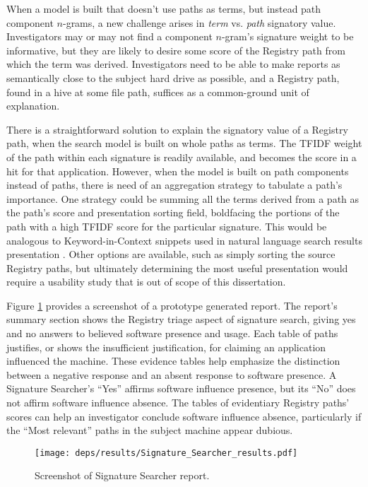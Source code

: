 \documentclass[11pt]{ucthesis}
\theoremstyle{plain}
\theoremstyle{definition}
\begin{document}
When a model is built that doesn't use paths as terms, but instead path component $n$-grams, a new challenge arises in \emph{term} vs. \emph{path} signatory value.  Investigators may or may not find a component $n$-gram's signature weight to be informative, but they are likely to desire some score of the Registry path from which the term was derived.  Investigators need to be able to make reports as semantically close to the subject hard drive as possible, and a Registry path, found in a hive at some file path, suffices as a common-ground unit of explanation.

There is a straightforward solution to explain the signatory value of a Registry path, when the search model is built on whole paths as terms.  The TFIDF weight of the path within each signature is readily available, and becomes the score in a hit for that application.  However, when the model is built on path components instead of paths, there is need of an aggregation strategy to tabulate a path's importance.  One strategy could be summing all the terms derived from a path as the path's score and presentation sorting field, boldfacing the portions of the path with a high TFIDF score for the particular signature.  This would be analogous to Keyword-in-Context snippets used in natural language search results presentation \cite{manning:mitpress99}.  Other options are available, such as simply sorting the source Registry paths, but ultimately determining the most useful presentation would require a usability study that is out of scope of this dissertation.

Figure \ref{fig:reportscreenshot} provides a screenshot of a prototype generated report.  The report's summary section shows the Registry triage aspect of signature search, giving yes and no answers to believed software presence and usage.  Each table of paths justifies, or shows the insufficient justification, for claiming an application influenced the machine.  These evidence tables help emphasize the distinction between a negative response and an absent response to software presence.  A Signature Searcher's ``Yes'' affirms software influence presence, but its ``No'' does not affirm software influence absence.  The tables of evidentiary Registry paths' scores can help an investigator conclude software influence absence, particularly if the ``Most relevant'' paths in the subject machine appear dubious.

\begin{figure}
\centering
\texttt{[image: deps/results/Signature\_Searcher\_results.pdf]}
\caption{\label{fig:reportscreenshot}Screenshot of Signature Searcher report.}
\end{figure}
\end{document}
